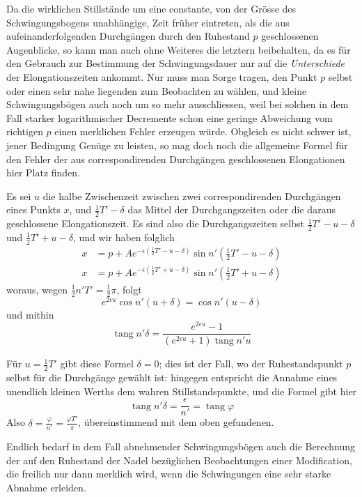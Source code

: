 Da die wirklichen Stillstände um eine constante, von der Grösse des Schwingungsbogens unabhängige, Zeit früher eintreten, als die aus aufeinanderfolgenden Durchgängen durch den Ruhestand $p$ geschlossenen Augenblicke, so kann man auch ohne Weiteres die letztern beibehalten, da es für den Gebrauch zur Bestimmung der Schwingungsdauer nur auf die \textit{Unterschiede} der Elongationszeiten ankommt. Nur muss man Sorge tragen, den Punkt $p$ selbst oder einen sehr nahe liegenden zum Beobachten zu wählen, und kleine Schwingungsbögen auch noch um so mehr ausschliessen, weil bei solchen in dem Fall starker logarithmischer Decremente schon eine geringe Abweichung vom richtigen $p$ einen merklichen Fehler erzeugen würde. Obgleich es nicht schwer ist, jener Bedingung Genüge zu leisten, so mag doch noch die allgemeine Formel für den Fehler der aus correspondirenden Durchgängen geschlossenen Elongationen hier Platz finden.

Es sei $u$ die halbe Zwischenzeit zwischen zwei correspondirenden Durchgängen eines Punkts $x$, und $\tfrac12T'-\delta$ das Mittel der Durchgangszeiten oder die daraus geschlossene Elongationszeit. Es sind also die Durchgangszeiten selbst $\tfrac12T'-u-\delta$ und $\tfrac12T'+u-\delta$, und wir haben folglich
\[
\begin{aligned}
x&=p+Ae^{-\epsilon(\tfrac12T'-u-\delta)}\sin n'(\tfrac12T'-u-\delta)\\
x&=p+Ae^{-\epsilon(\tfrac12T'+u-\delta)}\sin n'(\tfrac12T'+u-\delta)
\end{aligned}
\]
woraus, wegen $\tfrac12n'T'=\tfrac12\pi$, folgt
\[
e^{2\epsilon u}\cos n'(u+\delta)=\cos n'(u-\delta)
\]
und mithin
\[
\operatorname{tang}n'\delta=\frac{e^{2\epsilon u}-1}{(e^{2\epsilon u}+1)\operatorname{tang}n'u}
\]

Für $u=\tfrac12T'$ gibt diese Formel $\delta=0$; dies ist der Fall, wo der Ruhestandspunkt $p$ selbst für die Durchgänge gewählt ist: hingegen entspricht die Annahme eines unendlich kleinen Werths dem wahren Stillstandspunkte, und die Formel gibt hier
\[
\operatorname{tang}n'\delta=\frac{\epsilon}{n'}=\operatorname{tang}\varphi
\]
Also $\delta=\frac{\varphi}{n'}=\frac{\varphi T'}{\pi}$, übereinstimmend mit dem oben gefundenen.

Endlich bedarf in dem Fall abnehmender Schwingungsbögen auch die Berechnung der auf den Ruhestand der Nadel bezüglichen Beobachtungen einer Modification, die freilich nur dann merklich wird, wenn die Schwingungen eine sehr starke Abnahme erleiden.

